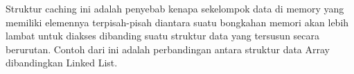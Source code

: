 \begin{enumerate}
    Struktur caching ini adalah penyebab kenapa sekelompok data di memory yang
    memiliki elemennya terpisah-pisah diantara suatu bongkahan memori akan lebih lambat
    untuk diakses dibanding suatu struktur data yang tersusun secara berurutan. Contoh
    dari ini adalah perbandingan antara struktur data Array dibandingkan Linked List.

\end{enumerate}
